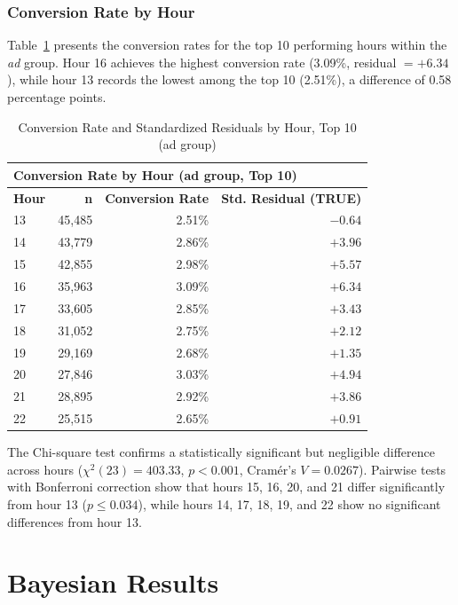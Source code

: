 \documentclass[12pt]{article}
\begin{document}
\subsubsection{Conversion Rate by Hour}

Table~\ref{tab:hour_summary} presents the conversion rates for the top 10 
performing hours within the \textit{ad} group. Hour 16 achieves the highest 
conversion rate (3.09\%, residual $= +6.34$), while hour 13 records the lowest 
among the top 10 (2.51\%), a difference of 0.58 percentage points.

\begin{table}[H]
\centering
\begin{tabular}{lrrr}
\toprule
\multicolumn{4}{l}{\textbf{Conversion Rate by Hour (ad group, Top 10)}} \\
\midrule
\textbf{Hour} & \textbf{n} & \textbf{Conversion Rate} & \textbf{Std. Residual (TRUE)} \\
\midrule
13 & 45,485 & 2.51\% & $-0.64$ \\
14 & 43,779 & 2.86\% & $+3.96$ \\
15 & 42,855 & 2.98\% & $+5.57$ \\
16 & 35,963 & 3.09\% & $+6.34$ \\
17 & 33,605 & 2.85\% & $+3.43$ \\
18 & 31,052 & 2.75\% & $+2.12$ \\
19 & 29,169 & 2.68\% & $+1.35$ \\
20 & 27,846 & 3.03\% & $+4.94$ \\
21 & 28,895 & 2.92\% & $+3.86$ \\
22 & 25,515 & 2.65\% & $+0.91$ \\
\bottomrule
\end{tabular}
\caption{Conversion Rate and Standardized Residuals by Hour, Top 10 (ad group)}
\label{tab:hour_summary}
\end{table}

The Chi-square test confirms a statistically significant but negligible difference 
across hours ($\chi^2(23) = 403.33$, $p < 0.001$, Cramér's $V = 0.0267$). 
Pairwise tests with Bonferroni correction show that hours 15, 16, 20, and 21 
differ significantly from hour 13 ($p \leq 0.034$), while hours 14, 17, 18, 
19, and 22 show no significant differences from hour 13.

\section{Bayesian Results}
\end{document}

